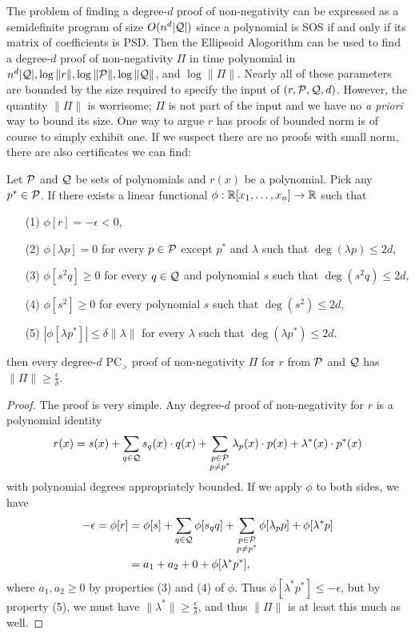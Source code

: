 The problem of finding a degree-$d$ proof of non-negativity can be expressed as a semidefinite program of size $O(n^d|\mathcal Q|)$ since a polynomial is SOS if and only if its matrix of coefficients is PSD. Then the Ellipsoid Alogorithm can be used to find a degree-$d$ proof of non-negativity $\Pi$ in time polynomial in $n^{d}|\mathcal Q|, \log \|r\|, \log \|\mathcal P\|, \log \|\mathcal Q\|$,  and $\log \|\Pi\|$. Nearly all of these parameters are bounded by the size required to specify the input of $(r,\mathcal P,\mathcal Q,d)$. However, the quantity $\|\Pi\|$ is worrisome; $\Pi$ is not part of the input and we have no \emph{a priori} way to bound its size. One way to argue $r$ has proofs of bounded norm is of course to simply exhibit one. If we suspect there are no proofs with small norm, there are also certificates we can find:
\begin{lemma}\label{lem:prelim_dual_cert}
Let $\mathcal P$ and $\mathcal Q$ be sets of polynomials and $r(x)$ be a polynomial. Pick any $p^* \in \mathcal P$. If there exists a linear functional $\phi: \mathbb R[x_1,\dots,x_n] \rightarrow \mathbb R$ such that
\begin{enumerate}
\item[(1)] $\phi[r] = -\epsilon < 0$,
\item[(2)] $\phi[\lambda p] = 0$ for every $p \in \mathcal P$ except $p^*$ and $\lambda$ such that $\deg (\lambda p) \leq 2d$,
\item[(3)] $\phi[s^2q] \geq 0$ for every $q \in \mathcal Q$ and polynomial $s$ such that $\deg (s^2q) \leq 2d$,
\item[(4)] $\phi[s^2] \geq 0$ for every polynomial $s$ such that $\deg (s^2) \leq 2d$,
\item[(5)] $|\phi[\lambda p^*]| \leq \delta \|\lambda\|$ for every $\lambda$ such that $\deg (\lambda p^*) \leq 2d$. %
\end{enumerate}
then every degree-$d$ PC$_>$ proof of non-negativity $\Pi$ for $r$ from $\mathcal P$ and $\mathcal Q$ has $\|\Pi\| \geq \frac{\epsilon}{\delta}$.
\end{lemma}
\begin{proof}
The proof is very simple. Any degree-$d$ proof of non-negativity for $r$ is a polynomial identity
\[r(x) = s(x) + \sum_{q \in \mathcal Q} s_q(x)\cdot q(x) + \sum_{\substack{p \in \mathcal P \\ p \neq p^*}} \lambda_p(x) \cdot p(x) + \lambda^*(x) \cdot p^*(x)\]
with polynomial degrees appropriately bounded. If we apply $\phi$ to both sides, we have
\begin{align*}
-\epsilon = \phi[r] &= \phi[s] + \sum_{q \in \mathcal Q} \phi[s_qq] + \sum_{\substack{p \in \mathcal P \\ p \neq p^*}} \phi[\lambda_p p] + \phi[\lambda^*p] \\
&= a_1 + a_2 + 0 + \phi[\lambda^* p^*],
\end{align*}
where $a_1,a_2 \geq 0$ by properties (3) and (4) of $\phi$. Thus $\phi[\lambda^* p^*] \leq -\epsilon$, but by property (5), we must have $\|\lambda^*\| \geq \frac{\epsilon}{\delta}$, and thus $\|\Pi\|$ is at least this much as well.
\end{proof}

